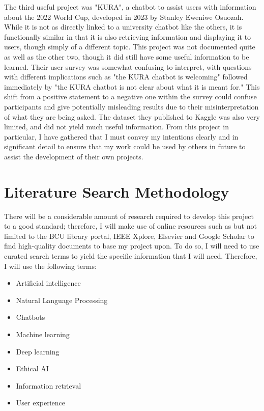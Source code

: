 \documentclass[12pt]{report}
\begin{document}
    \noindent The third useful project was "KURA", a chatbot to assist users with information about the 2022 World
    Cup, developed in 2023 by Stanley Eweniwe Osuozah. While it is not as directly linked to a university chatbot 
    like the others, it is functionally similar in that it is also retrieving information and displaying it to users,
    though simply of a different topic. This project was not documented quite as well as the other
    two, though it did still have some useful information to be learned. Their user survey was somewhat confusing to 
    interpret, with questions with different implications such as "the KURA chatbot is welcoming" followed immediately
    by "the KURA chatbot is not clear about what it is meant for." This shift from a positive statement to a negative one
    within the survey could confuse participants and give potentially misleading results due to their misinterpretation
    of what they are being asked. The dataset they published to Kaggle was also very limited, and did not yield
    much useful information. From this project in particular, I have gathered that I must convey my intentions 
    clearly and in significant detail to ensure that my work could be used by others in future to assist the 
    development of their own projects.
    
    \pagebreak

    \section{Literature Search Methodology}
    There will be a considerable amount of research required to develop this project to a good standard; therefore,
    I will make use of online resources such as but not limited to the BCU library portal, IEEE Xplore, Elsevier
    and Google Scholar to find high-quality documents to base my project upon. To do so, I will need to use 
    curated search terms to yield the specific information that I will need. Therefore,
    I will use the following terms:

    \begin{itemize}
        \item Artificial intelligence
        \item Natural Language Processing
        \item Chatbots 
        \item Machine learning
        \item Deep learning
        \item Ethical AI
        \item Information retrieval
        \item User experience
    \end{itemize}
\end{document}
